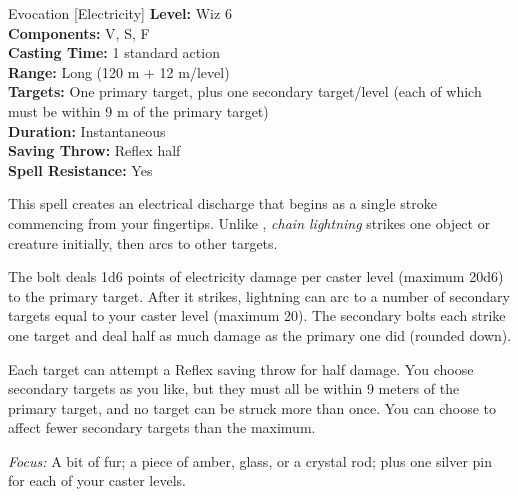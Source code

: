 {Evocation [Electricity]}
{
	\textbf{Level:}
	Wiz 6\\
	\textbf{Components:}
	V, S, F\\
	\textbf{Casting Time:}
	1 standard action\\
	\textbf{Range:}
	Long (120 m + 12 m/level)\\
	\textbf{Targets:}
	One primary target, plus one secondary target/level (each of which must be within 9 m of the primary target)\\
	\textbf{Duration:}
	Instantaneous\\
	\textbf{Saving Throw:}
	Reflex half\\
	\textbf{Spell Resistance:}
	Yes\\
}
{
	This spell creates an electrical discharge that begins as a single stroke commencing from your fingertips. Unlike , \emph{chain lightning} strikes one object or creature initially, then arcs to other targets.

	The bolt deals 1d6 points of electricity damage per caster level (maximum 20d6) to the primary target. After it strikes, lightning can arc to a number of secondary targets equal to your caster level (maximum 20). The secondary bolts each strike one target and deal half as much damage as the primary one did (rounded down).

	Each target can attempt a Reflex saving throw for half damage. You choose secondary targets as you like, but they must all be within 9 meters of the primary target, and no target can be struck more than once. You can choose to affect fewer secondary targets than the maximum.

	\textit{Focus:}
	A bit of fur; a piece of amber, glass, or a crystal rod; plus one silver pin for each of your caster levels.

}
